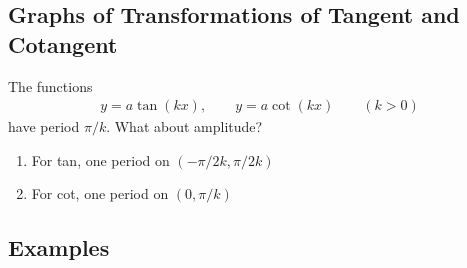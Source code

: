 \documentclass{tufte-handout}
\begin{document}
\subsection{Graphs of Transformations of Tangent and Cotangent}

The functions 
\begin{align*}
y = a\tan(kx), \qquad y = a\cot(kx) \qquad (k > 0) 
\end{align*}
have period $\pi/k$. 
What about amplitude?
\begin{enumerate}
\item For tan, one period on $(-\pi/2k, \pi/2k)$
\item For cot, one period on $(0, \pi/k)$
\end{enumerate}

\subsection{Examples}
\end{document}
